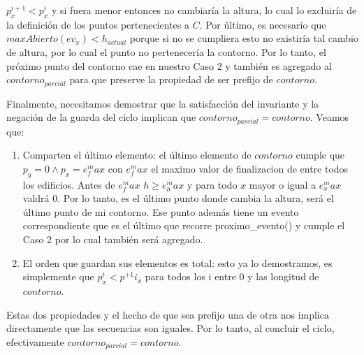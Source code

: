 $p^{i+1}_x < p^{i}_x$ y si fuera menor entonces no cambiaría la altura, lo cual lo excluiría de la definición de los 
puntos pertenecientes a $C$. Por último, es necesario que $maxAbierto(ev_x) < h_{actual}$ porque si no se cumpliera
esto no existiría tal cambio de altura, por lo cual el punto no pertenecería la contorno. Por lo tanto, el próximo punto
del contorno cae en nuestro Caso 2 y también es agregado al $contorno_{parcial}$ para que preserve la propiedad
de ser prefijo de $contorno$.
\par
Finalmente, necesitamos demostrar que la satisfacción del invariante y la negación de la guarda del ciclo implican que 
$contorno_{parcial} = contorno$. Veamos que:
\begin{enumerate}
	\item Comparten el último elemento: el último elemento de $contorno$ cumple que $p_y = 0 \land p_x = e_f^max$ con $e_f^max$
	el maximo valor de finalizacion de entre todos los edificios. Antes de $e_f^max$ $h \geq e_h^max$ y para todo $x$ mayor o igual
	a $e_x^max$ valdrá 0. Por lo tanto, es el último punto donde cambia la altura, será el último punto de mi contorno. Ese punto
	además tiene un evento correspondiente que es el último que recorre proximo\_evento() y cumple el Caso 2 por lo
	cual también será agregado.
	\item El orden que guardan sus elementos es total: esto ya lo demostramos, es simplemente que $p^i_x < p^{+1}i_x$ para 
	todos los i entre 0 y las longitud de $contorno$. 
\end{enumerate}
Estas dos propiedades y el hecho de que sea prefijo una de otra nos implica directamente que las secuencias son iguales. Por
lo tanto, al concluir el ciclo, efectivamente $contorno_{parcial} = contorno$.